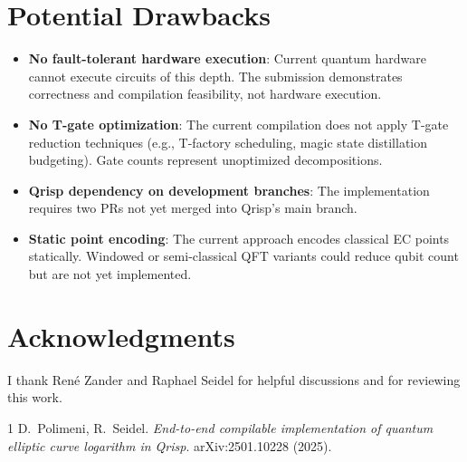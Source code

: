 \documentclass[11pt,a4paper]{article}
\begin{document}
\section*{Potential Drawbacks}

\begin{itemize}[nosep,leftmargin=1.2em]
    \item \textbf{No fault-tolerant hardware execution}: Current quantum hardware cannot execute circuits of this depth. The submission demonstrates correctness and compilation feasibility, not hardware execution.
    \item \textbf{No T-gate optimization}: The current compilation does not apply T-gate reduction techniques (e.g., T-factory scheduling, magic state distillation budgeting). Gate counts represent unoptimized decompositions.
    \item \textbf{Qrisp dependency on development branches}: The implementation requires two PRs not yet merged into Qrisp's main branch.
    \item \textbf{Static point encoding}: The current approach encodes classical EC points statically. Windowed or semi-classical QFT variants could reduce qubit count but are not yet implemented.
\end{itemize}

\section*{Acknowledgments}

I thank Ren\'e Zander and Raphael Seidel for helpful discussions and for reviewing this work.

\begin{thebibliography}{1}
 D.~Polimeni, R.~Seidel. \emph{End-to-end compilable implementation of quantum elliptic curve logarithm in Qrisp}. arXiv:2501.10228 (2025).
\end{thebibliography}
\end{document}
